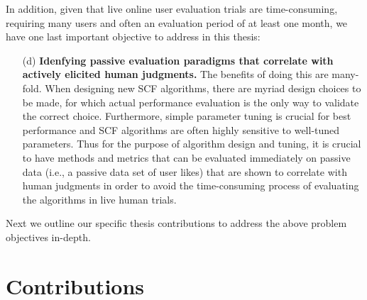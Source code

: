 In addition, given that live online user evaluation trials are
time-consuming, requiring many users and often an evaluation period of
at least one month, we have one last important objective to address in
this thesis:
\begin{enumerate}
\item[(d)] {\bf Idenfying passive evaluation paradigms that correlate
with actively elicited human judgments.}  The benefits of doing this
are many-fold.  When designing new SCF algorithms, there are myriad
design choices to be made, for which actual performance evaluation is
the only way to validate the correct choice.  Furthermore, simple
parameter tuning is crucial for best performance and SCF algorithms
are often highly sensitive to well-tuned parameters.  Thus for the
purpose of algorithm design and tuning, it is crucial to have methods
and metrics that can be evaluated immediately on passive data (i.e., a
passive data set of user likes) that are shown to correlate with human
judgments in order to avoid the time-consuming process of evaluating
the algorithms in live human trials.
\end{enumerate}

Next we outline our specific thesis contributions to address
the above problem objectives in-depth.

\section{Contributions}

\label{sec:Contributions}

